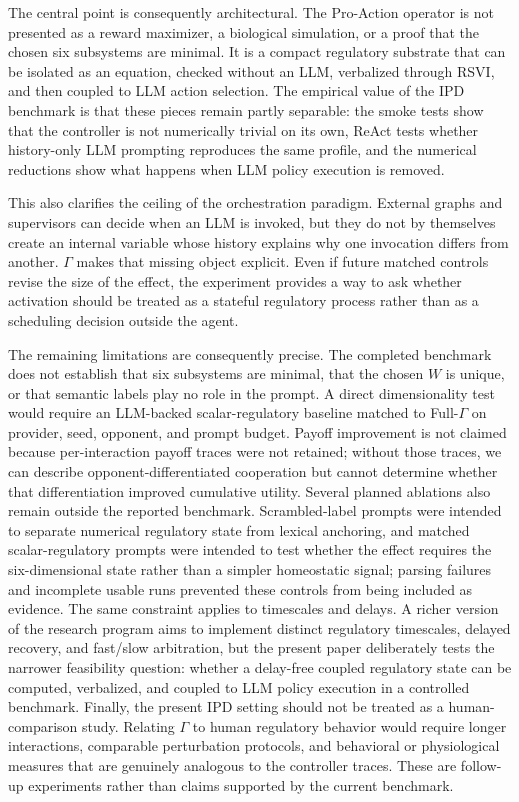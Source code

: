\documentclass{article}
\begin{document}
The central point is consequently architectural. The Pro-Action operator is not presented as a reward maximizer, a biological simulation, or a proof that the chosen six subsystems are minimal. It is a compact regulatory substrate that can be isolated as an equation, checked without an LLM, verbalized through RSVI, and then coupled to LLM action selection. The empirical value of the IPD benchmark is that these pieces remain partly separable: the smoke tests show that the controller is not numerically trivial on its own, ReAct tests whether history-only LLM prompting reproduces the same profile, and the numerical reductions show what happens when LLM policy execution is removed.

This also clarifies the ceiling of the orchestration paradigm. External graphs and supervisors can decide when an LLM is invoked, but they do not by themselves create an internal variable whose history explains why one invocation differs from another. $\Gamma$ makes that missing object explicit. Even if future matched controls revise the size of the effect, the experiment provides a way to ask whether activation should be treated as a stateful regulatory process rather than as a scheduling decision outside the agent.

The remaining limitations are consequently precise. The completed benchmark does not establish that six subsystems are minimal, that the chosen $W$ is unique, or that semantic labels play no role in the prompt. A direct dimensionality test would require an LLM-backed scalar-regulatory baseline matched to Full-$\Gamma$ on provider, seed, opponent, and prompt budget. Payoff improvement is not claimed because per-interaction payoff traces were not retained; without those traces, we can describe opponent-differentiated cooperation but cannot determine whether that differentiation improved cumulative utility. Several planned ablations also remain outside the reported benchmark. Scrambled-label prompts were intended to separate numerical regulatory state from lexical anchoring, and matched scalar-regulatory prompts were intended to test whether the effect requires the six-dimensional state rather than a simpler homeostatic signal; parsing failures and incomplete usable runs prevented these controls from being included as evidence. The same constraint applies to timescales and delays. A richer version of the research program aims to implement distinct regulatory timescales, delayed recovery, and fast/slow arbitration, but the present paper deliberately tests the narrower feasibility question: whether a delay-free coupled regulatory state can be computed, verbalized, and coupled to LLM policy execution in a controlled benchmark. Finally, the present IPD setting should not be treated as a human-comparison study. Relating $\Gamma$ to human regulatory behavior would require longer interactions, comparable perturbation protocols, and behavioral or physiological measures that are genuinely analogous to the controller traces. These are follow-up experiments rather than claims supported by the current benchmark.
\end{document}
